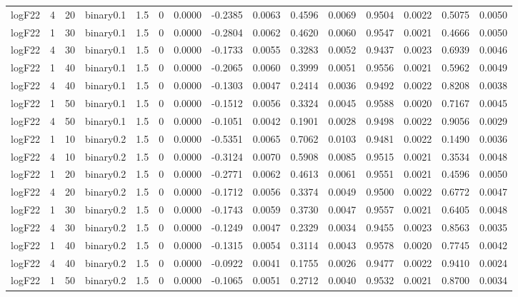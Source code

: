 \begin{longtable}{rrrrrrrrrrrrrrr}
  logF22 & 4 & 20 & binary0.1 & 1.5 & 0 & 0.0000 & -0.2385 & 0.0063 & 0.4596 & 0.0069 & 0.9504 & 0.0022 & 0.5075 & 0.0050 \\ 
  logF22 & 1 & 30 & binary0.1 & 1.5 & 0 & 0.0000 & -0.2804 & 0.0062 & 0.4620 & 0.0060 & 0.9547 & 0.0021 & 0.4666 & 0.0050 \\ 
  logF22 & 4 & 30 & binary0.1 & 1.5 & 0 & 0.0000 & -0.1733 & 0.0055 & 0.3283 & 0.0052 & 0.9437 & 0.0023 & 0.6939 & 0.0046 \\ 
  logF22 & 1 & 40 & binary0.1 & 1.5 & 0 & 0.0000 & -0.2065 & 0.0060 & 0.3999 & 0.0051 & 0.9556 & 0.0021 & 0.5962 & 0.0049 \\ 
  logF22 & 4 & 40 & binary0.1 & 1.5 & 0 & 0.0000 & -0.1303 & 0.0047 & 0.2414 & 0.0036 & 0.9492 & 0.0022 & 0.8208 & 0.0038 \\ 
  logF22 & 1 & 50 & binary0.1 & 1.5 & 0 & 0.0000 & -0.1512 & 0.0056 & 0.3324 & 0.0045 & 0.9588 & 0.0020 & 0.7167 & 0.0045 \\ 
  logF22 & 4 & 50 & binary0.1 & 1.5 & 0 & 0.0000 & -0.1051 & 0.0042 & 0.1901 & 0.0028 & 0.9498 & 0.0022 & 0.9056 & 0.0029 \\ 
  logF22 & 1 & 10 & binary0.2 & 1.5 & 0 & 0.0000 & -0.5351 & 0.0065 & 0.7062 & 0.0103 & 0.9481 & 0.0022 & 0.1490 & 0.0036 \\ 
  logF22 & 4 & 10 & binary0.2 & 1.5 & 0 & 0.0000 & -0.3124 & 0.0070 & 0.5908 & 0.0085 & 0.9515 & 0.0021 & 0.3534 & 0.0048 \\ 
  logF22 & 1 & 20 & binary0.2 & 1.5 & 0 & 0.0000 & -0.2771 & 0.0062 & 0.4613 & 0.0061 & 0.9551 & 0.0021 & 0.4596 & 0.0050 \\ 
  logF22 & 4 & 20 & binary0.2 & 1.5 & 0 & 0.0000 & -0.1712 & 0.0056 & 0.3374 & 0.0049 & 0.9500 & 0.0022 & 0.6772 & 0.0047 \\ 
  logF22 & 1 & 30 & binary0.2 & 1.5 & 0 & 0.0000 & -0.1743 & 0.0059 & 0.3730 & 0.0047 & 0.9557 & 0.0021 & 0.6405 & 0.0048 \\ 
  logF22 & 4 & 30 & binary0.2 & 1.5 & 0 & 0.0000 & -0.1249 & 0.0047 & 0.2329 & 0.0034 & 0.9455 & 0.0023 & 0.8563 & 0.0035 \\ 
  logF22 & 1 & 40 & binary0.2 & 1.5 & 0 & 0.0000 & -0.1315 & 0.0054 & 0.3114 & 0.0043 & 0.9578 & 0.0020 & 0.7745 & 0.0042 \\ 
  logF22 & 4 & 40 & binary0.2 & 1.5 & 0 & 0.0000 & -0.0922 & 0.0041 & 0.1755 & 0.0026 & 0.9477 & 0.0022 & 0.9410 & 0.0024 \\ 
  logF22 & 1 & 50 & binary0.2 & 1.5 & 0 & 0.0000 & -0.1065 & 0.0051 & 0.2712 & 0.0040 & 0.9532 & 0.0021 & 0.8700 & 0.0034 \\ 

\end{longtable}
